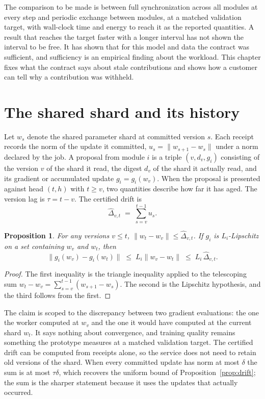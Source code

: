 \documentclass[11pt,openany]{book}
\newtheorem{proposition}{Proposition}[chapter]
\theoremstyle{remark}
\begin{document}
The comparison to be made is between full synchronization across all modules at every step and periodic exchange between modules, at a matched validation target, with wall-clock time and energy to reach it as the reported quantities. A result that reaches the target faster with a longer interval has not shown the interval to be free. It has shown that for this model and data the contract was sufficient, and sufficiency is an empirical finding about the workload. This chapter fixes what the contract says about stale contributions and shows how a customer can tell why a contribution was withheld.

\section{The shared shard and its history}

Let $w_s$ denote the shared parameter shard at committed version $s$. Each receipt records the norm of the update it committed, $u_s=\lVert w_{s+1}-w_s\rVert$ under a norm declared by the job. A proposal from module $i$ is a triple $(v,d_v,g_i)$ consisting of the version $v$ of the shard it read, the digest $d_v$ of the shard it actually read, and its gradient or accumulated update $g_i=g_i(w_v)$. When the proposal is presented against head $(t,h)$ with $t\ge v$, two quantities describe how far it has aged. The version lag is $\tau=t-v$. The certified drift is
\[
\hat\Delta_{v,t}\;=\;\sum_{s=v}^{t-1}u_s .
\]

\begin{proposition}\label{prop:gradbound}
For any versions $v\le t$, $\lVert w_t-w_v\rVert\le\hat\Delta_{v,t}$. If $g_i$ is $L_i$-Lipschitz on a set containing $w_v$ and $w_t$, then
\[
\lVert g_i(w_v)-g_i(w_t)\rVert\;\le\;L_i\lVert w_v-w_t\rVert\;\le\;L_i\,\hat\Delta_{v,t}.
\]
\end{proposition}
\begin{proof}
The first inequality is the triangle inequality applied to the telescoping sum $w_t-w_v=\sum_{s=v}^{t-1}(w_{s+1}-w_s)$. The second is the Lipschitz hypothesis, and the third follows from the first.
\end{proof}

The claim is scoped to the discrepancy between two gradient evaluations: the one the worker computed at $w_v$ and the one it would have computed at the current shard $w_t$. It says nothing about convergence, and training quality remains something the prototype measures at a matched validation target. The certified drift can be computed from receipts alone, so the service does not need to retain old versions of the shard. When every committed update has norm at most $\delta$ the sum is at most $\tau\delta$, which recovers the uniform bound of Proposition~\ref{prop:drift}; the sum is the sharper statement because it uses the updates that actually occurred.
\end{document}

